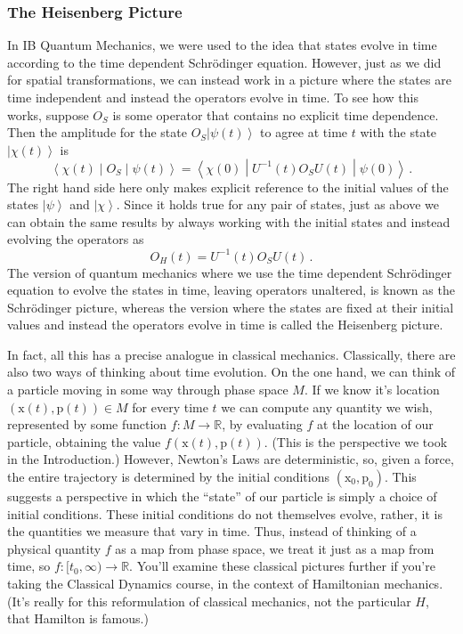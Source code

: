 \documentclass{article}
\theoremstyle{plain}\theoremheaderfont{\normalfont\itshape}\theorembodyfont{\rmfamily}\theoremseparator{.}\newtheorem*{rem}{Remark}\newtheorem*{ex}{Example}\newtheorem*{proof}{Proof}\newtheorem*{altp}{Alternative proof}
\theoremstyle{plain}\theoremheaderfont{\normalfont\bfseries}\theorembodyfont{\rmfamily}\theoremseparator{.}\newtheorem{thm}{Theorem}[section]\newtheorem{lem}[thm]{Lemma}\newtheorem{prop}[thm]{Proposition}\newtheorem*{cor}{Corollary}\newtheorem{defn}[thm]{Definition}\newtheorem{clm}[thm]{Claim}\newtheorem{clminproof}{Claim}
\theoremstyle{break}\theoremheaderfont{\normalfont\itshape}\theorembodyfont{\rmfamily}\theoremseparator{.\medskip}\newtheorem*{proofskip}{Proof}\newtheorem*{exs}{Examples}\newtheorem*{rems}{Remarks}
\theoremstyle{break}\theoremheaderfont{\normalfont\bfseries}\theorembodyfont{\rmfamily}\theoremseparator{.\medskip}\newtheorem{lemskip}[thm]{Lemma}\newtheorem{defnskip}[thm]{Definition}\newtheorem{propskip}[thm]{Proposition}\newtheorem{thmskip}[thm]{Theorem}
\numberwithin{equation}{section}
\newcommand{\ket}[1]{\left| #1 \right\rangle}
\newcommand{\mel}[3]{\left\langle #1 \middle| #2 \middle| #3 \right\rangle}
\newcommand{\vb}[1]{\bm{\mathrm{#1}}}
\newcommand{\RR}{\mathbb{R}}
\begin{document}
    \subsubsection{The Heisenberg Picture}
    In IB Quantum Mechanics, we were used to the idea that states evolve in time according to the time dependent Schr\"{o}dinger equation. However, just as we did for spatial transformations, we can instead work in a picture where the states are time independent and instead the operators evolve in time. To see how this works, suppose \(O_S\) is some operator that contains no explicit time dependence. Then the amplitude for the state \(O_S\ket{\psi(t)}\) to agree at time \(t\) with the state \(\ket{\chi(t)}\) is
    \begin{equation}\label{Heisenberg_picture}
        \mel{\chi(t)}{O_S}{\psi(t)}=\mel{\chi(0)}{U^{-1}(t)O_S U(t)}{\psi(0)}\,.
    \end{equation}
    The right hand side here only makes explicit reference to the initial values of the states \(\ket{\psi}\) and \(\ket{\chi}\). Since it holds true for any pair of states, just as above we can obtain the same results by always working with the initial states and instead evolving the operators as
    \begin{equation}
        O_H(t)=U^{-1}(t)O_S U(t)\,.
    \end{equation}
    The version of quantum mechanics where we use the time dependent Schr\"{o}dinger equation to evolve the states in time, leaving operators unaltered, is known as the Schr\"{o}dinger picture, whereas the version where the states are fixed at their initial values and instead the operators evolve in time is called the Heisenberg picture.

    In fact, all this has a precise analogue in classical mechanics. Classically, there are also two ways of thinking about time evolution. On the one hand, we can think of a particle moving in some way through phase space \(M\). If we know it's location \((\vb{x}(t),\vb{p}(t))\in M\) for every time \(t\) we can compute any quantity we wish, represented by some function \(f:M\to\RR\), by evaluating \(f\) at the location of our particle, obtaining the value \(f(\vb{x}(t),\vb{p}(t))\). (This is the perspective we took in the Introduction.) However, Newton's Laws are deterministic, so, given a force, the entire trajectory is determined by the initial conditions \((\vb{x}_0,\vb{p}_0)\). This suggests a perspective in which the ``state'' of our particle is simply a choice of initial conditions. These initial conditions do not themselves evolve, rather, it is the quantities we measure that vary in time. Thus, instead of thinking of a physical quantity \(f\) as a map from phase space, we treat it just as a map from time, so \(f:[t_0,\infty)\to\RR\). You'll examine these classical pictures further if you're taking the Classical Dynamics course, in the context of Hamiltonian mechanics. (It's really for this reformulation of classical mechanics, not the particular \(H\), that Hamilton is famous.)
\end{document}
